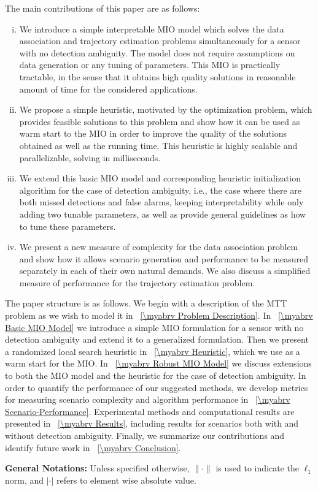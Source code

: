 The main contributions of this paper are as follows: 
\begin{enumerate}[(i)]
\item We introduce a simple interpretable MIO model which solves the data association and trajectory estimation problems simultaneously for a sensor with no detection ambiguity. The model does not require assumptions on data generation or any tuning of parameters. This MIO is practically tractable, in the sense that it obtains high quality solutions in reasonable amount of time for the considered applications.
\item We propose a simple heuristic, motivated by the optimization problem, which provides feasible solutions to this problem and show how it can be used as warm start to the MIO in order to improve the quality of the solutions obtained as well as the running time. This heuristic is highly scalable and parallelizable, solving in milliseconds.
\item We extend this basic MIO model and corresponding heuristic initialization algorithm for the case of detection ambiguity, i.e., the case where there are both missed detections and false alarms, keeping interpretability while only adding two tunable parameters, as well as provide general guidelines as how to tune these parameters. 
\item  We present a new measure of complexity for the data association problem and show how it allows scenario generation and performance to be measured separately in each of their own natural demands. We also discuss a simplified measure of performance for the trajectory estimation problem. 
\end{enumerate}

The paper structure is as follows. We begin with a description of the MTT problem as we wish to model it in \mysection~\ref{\myabrv Problem Description}. In \mysection~\ref{\myabrv Basic MIO Model} we introduce a simple MIO formulation for a sensor with no detection ambiguity and extend it to a generalized formulation. Then we present a randomized local search heuristic in \mysection~\ref{\myabrv Heuristic}, which we use as a warm start for the MIO. In \mysection~\ref{\myabrv Robust MIO Model} we discuss extensions to both the MIO model and the heuristic for the case of detection ambiguity. In order to quantify the performance of our suggested methods, we develop metrics for measuring scenario complexity and algorithm performance in \mysection~\ref{\myabrv Scenario-Performance}.  Experimental methods and computational results are presented in \mysection~\ref{\myabrv Results}, including results for scenarios both with and without detection ambiguity. Finally, we summarize our contributions and identify future work in \mysection~\ref{\myabrv Conclusion}.

{\bf General Notations:}
Unless specified otherwise, $\|\cdot\|$ is used to indicate the $\ell_1$ norm, and $|\cdot|$ refers to element wise absolute value.